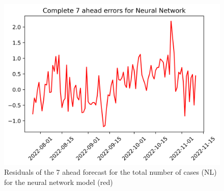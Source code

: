 \begin{figure}
\begin{minipage}{.32\textwidth}
\end{minipage}
\begin{minipage}{.32\textwidth}
  \centering
  \includegraphics[width=\linewidth]{pics/7_ah/7_ahead_errors_Neural Network.png}
  \caption{Residuals of the 7 ahead forecast for the total number of cases (NL) for the neural network model (red)}
  \label{fig:tot_cases_error_7_nn}
\end{minipage}

\end{figure}
